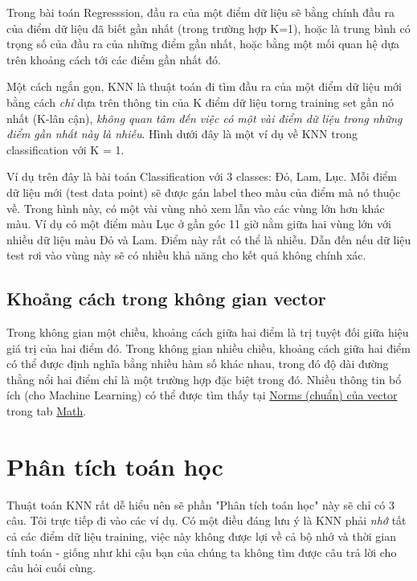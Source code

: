 Trong bài toán Regresssion, đầu ra của một điểm dữ liệu sẽ bằng chính đầu ra của điểm dữ liệu đã biết gần nhất (trong trường hợp K=1), hoặc là trung bình có trọng số của đầu ra của những điểm gần nhất, hoặc bằng một mối quan hệ dựa trên khoảng cách tới các điểm gần nhất đó.  
 
Một cách ngắn gọn, KNN là thuật toán đi tìm đầu ra của một điểm dữ liệu mới bằng cách \textit{chỉ} dựa trên thông tin của K điểm dữ liệu torng training set gần nó nhất (K-lân cận), \textit{không quan tâm đến việc có một vài điểm dữ liệu trong những điểm gần nhất này là nhiễu}. Hình dưới đây là một ví dụ về KNN trong classification với K = 1. 
 
 
Ví dụ trên đây là bài toán Classification với 3 classes: Đỏ, Lam, Lục. Mỗi điểm dữ liệu mới (test data point) sẽ được gán label theo màu của điểm mà nó thuộc về. Trong hình này, có một vài vùng nhỏ xem lẫn vào các vùng lớn hơn khác màu. Ví dụ có một điểm màu Lục ở gần góc 11 giờ nằm giữa hai vùng lớn với nhiều dữ liệu màu Đỏ và Lam. Điểm này rất có thể là nhiễu. Dẫn đến nếu dữ liệu test rơi vào vùng này sẽ có nhiều khả năng cho kết quả không chính xác.  
 
 
 
 
\subsection{Khoảng cách trong không gian vector}
 
Trong không gian một chiều, khoảng cách giữa hai điểm là trị tuyệt đối giữa hiệu giá trị của hai điểm đó. Trong không gian nhiều chiều, khoảng cách giữa hai điểm có thể được định nghĩa bằng nhiều hàm số khác nhau, trong đó độ dài đường thằng nổi hai điểm chỉ là một trường hợp đặc biệt trong đó. Nhiều thông tin bổ ích (cho Machine Learning) có thể được tìm thấy tại \href{http://machinelearningcoban.com/math/#-norms-chuan}{Norms (chuẩn) của vector} trong tab \href{http://machinelearningcoban.com/math/}{Math}. 
 
 
 
 
\section{Phân tích toán học}
Thuật toán KNN rất dễ hiểu nên sẽ phần "Phân tích toán học" này sẽ chỉ có 3 câu. Tôi trực tiếp đi vào các ví dụ. Có một điều đáng lưu ý là KNN phải \textit{nhớ} tất cả các điểm dữ liệu training, việc này không được lợi về cả bộ nhớ và thời gian tính toán - giống như khi cậu bạn của chúng ta không tìm được câu trả lời cho câu hỏi cuối cùng. 
 
